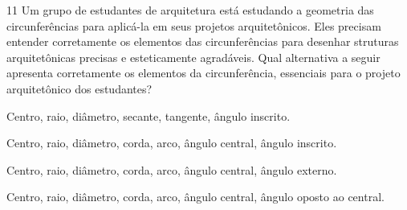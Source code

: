 
\num{11} Um grupo de estudantes de arquitetura está estudando a geometria
das circunferências para aplicá-la em seus projetos arquitetônicos. Eles
precisam entender corretamente os elementos das circunferências para desenhar 
struturas arquitetônicas precisas e esteticamente agradáveis. Qual alternativa
a seguir apresenta corretamente os elementos da circunferência, essenciais para
o projeto arquitetônico dos estudantes?

\begin{escolha}
\item Centro, raio, diâmetro, secante, tangente, ângulo inscrito.

\item Centro, raio, diâmetro, corda, arco, ângulo central, ângulo inscrito.

\item Centro, raio, diâmetro, corda, arco, ângulo central, ângulo externo.

\item Centro, raio, diâmetro, corda, arco, ângulo central, ângulo oposto ao central.
\end{escolha}



